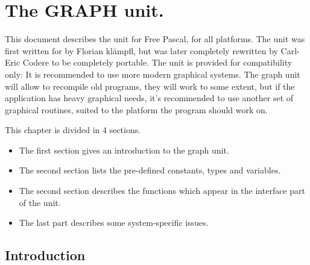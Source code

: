%
%
%
%
%
\chapter{The GRAPH unit.}
This document describes the  unit for Free Pascal, for all
platforms. The unit was first written for \dos by Florian kl\"ampfl, but was
later completely rewritten by Carl-Eric Codere to be completely portable.
The unit is provided for compatibility only: It is recommended to use more
modern graphical systems. The graph unit will allow to recompile old
programs, they will work to some extent, but if the application has 
heavy graphical needs, it's recommended to use another set of graphical
routines, suited to the platform the program should work on.

This chapter is divided in 4 sections. 
\begin{itemize}
\item The first section gives an introduction to the graph unit.
\item The second section lists the pre-defined constants, types and variables. 
\item The second section describes the functions which appear in the
interface part of the  unit.
\item The last part describes some system-specific issues.

\end{itemize}
\section{Introduction}
\label{se:Introduction}
